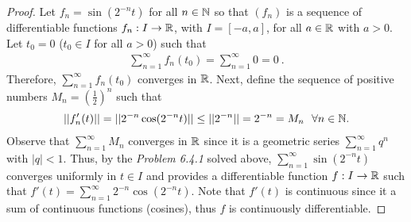 \begin{questions}


\begin{solution}
  \begin{proof}
Let $f_n=\sin (2^{-n}t)$ for all $n\in\mathbb{N}$ so that $(f_n)$ is a sequence of differentiable functions $f_n:I\rightarrow\mathbb{R}$, with $I=[-a,a]$, for all $a\in\mathbb{R}$ with $a>0$. Let $t_0=0$ ($t_0\in I$ for all $a>0$) such that
\begin{align*}
\sum_{n=1}^{\infty}f_n(t_0)=\sum_{n=1}^{\infty}0=0~.
\end{align*}
Therefore, $\sum_{n=1}^{\infty}f_n(t_0)$ converges in $\mathbb{R}$. Next, define the sequence of positive numbers $M_n=\left(\frac{1}{2}\right)^n$ such that
\begin{align*}
||f'_n(t)||=||2^{-n}\cos(2^{-n}t)||\leq||2^{-n}||=2^{-n}=M_n~~\forall n\in\mathbb{N}.
\end{align*}
Observe that $\sum_{n=1}^{\infty}M_n$ converges in $\mathbb{R}$ since it is a geometric series $\sum_{n=1}^{\infty}q^n$ with $|q|<1$. Thus, by the \textit{Problem 6.4.1} solved above, $\sum_{n=1}^{\infty}\sin (2^{-n}t)$ converges uniformly in $t\in I$ and provides a differentiable function $f:I\rightarrow\mathbb{R}$ such that $f'(t)=\sum_{n=1}^{\infty}2^{-n}\cos (2^{-n}t)$. Note that $f'(t)$ is continuous since it a sum of continuous functions (cosines), thus $f$ is continuously differentiable.
\end{proof}
\end{solution}
\end{questions}